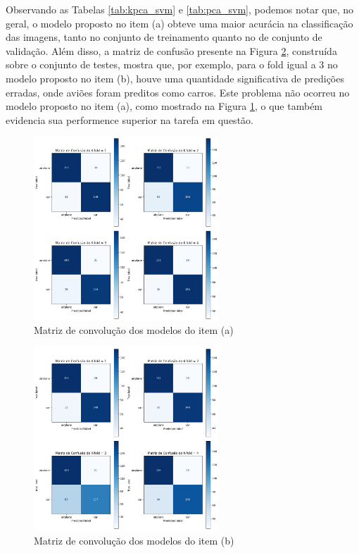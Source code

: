 \documentclass[]{abntex2}
\begin{document}
Observando as Tabelas \ref{tab:kpca_svm} e \ref{tab:pca_svm}, podemos notar que, no geral, o modelo proposto no item (a) obteve uma maior acurácia na classificação das imagens, tanto no conjunto de treinamento quanto no de conjunto de validação. Além disso, a matriz de confusão presente na Figura \ref{fig:1conf_b}, construída sobre o conjunto de testes, mostra que, por exemplo, para o fold igual a 3 no modelo proposto no item (b), houve uma quantidade significativa de predições erradas, onde aviões foram preditos como carros. Este problema não ocorreu no modelo proposto no item (a), como mostrado na Figura \ref{fig:1conf_a}, o que também evidencia sua performence superior na tarefa em questão.

\begin{figure}[H]
    \centering 
    \includegraphics[width=0.62\textwidth]{imgs/ex1/conf_a.png}
    \caption{Matriz de convolução dos modelos do item (a)}
    \label{fig:1conf_a} %
\end{figure}

\begin{figure}[H]
    \centering 
    \includegraphics[width=0.62\textwidth]{imgs/ex1/conf_b.png}
    \caption{Matriz de convolução dos modelos do item (b)}
    \label{fig:1conf_b} %
\end{figure}
\end{document}
